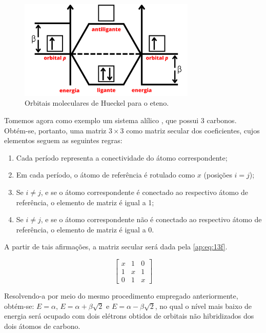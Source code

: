 \begin{figure}[htb]
	\caption{\label{fig:A2} Orbitais moleculares de Hueckel para o eteno.}
	\begin{center}
		\includegraphics[width=0.75\textwidth]{images/figA2.png}
	\end{center}
\end{figure}

Tomemos agora como exemplo um sistema alílico \ce{[CH_2=CH-CH_2-]}, que possui 3 carbonos. Obtém-se, portanto, uma matriz $3 \times 3$ como matriz secular dos coeficientes, cujos elementos seguem as seguintes regras:

\begin{enumerate}
    \item Cada período representa a conectividade do átomo correspondente;
    \item Em cada período, o átomo de referência é rotulado como $x$ (posições $i=j$);
    \item Se $i \neq j$, e se o átomo correspondente é conectado ao respectivo átomo de referência, o elemento de matriz é igual a 1;
    \item Se $i \neq j$, e se o átomo correspondente não é conectado ao respectivo átomo de referência, o elemento de matriz é igual a 0.
\end{enumerate}

\noindent A partir de tais afirmações, a matriz secular será dada pela \autoref{ap:eq:13f}.

\begin{equation}
\label{ap:eq:13f}
\begin{bmatrix}
    x & 1 & 0 \\
    1 & x & 1 \\
    0 & 1 & x 
\end{bmatrix}
\end{equation}

Resolvendo-a por meio do mesmo procedimento empregado anteriormente, obtém-se: $E = \alpha$, $E = \alpha + \beta \sqrt{2}$ e $E = \alpha - \beta \sqrt{2}$, no qual o nível mais baixo de energia será ocupado com dois elétrons obtidos de orbitais não hibridizados dos dois átomos de carbono.

